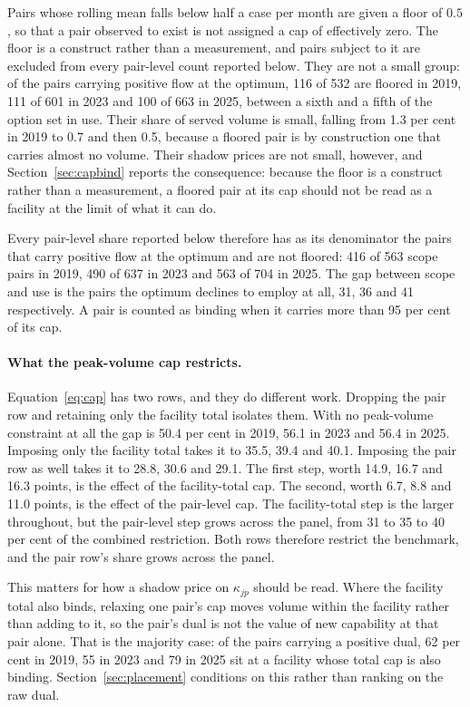 Pairs whose rolling mean falls below half a case per month are given a floor of
$0.5$, so that a pair observed to exist is not assigned a cap of effectively
zero. The floor is a construct rather than a measurement, and pairs subject to it
are excluded from every pair-level count reported below. They are not a small
group: of the pairs carrying positive flow at the optimum, 116 of 532 are floored
in 2019, 111 of 601 in 2023 and 100 of 663 in 2025, between a sixth and a fifth
of the option set in use. Their share of served volume is small, falling from
1.3 per cent in 2019 to 0.7 and then 0.5, because a floored pair is by
construction one that carries almost no volume. Their shadow prices are not
small, however, and Section~\ref{sec:capbind} reports the consequence: because
the floor is a construct rather than a measurement, a floored pair at its cap
should not be read as a facility at the limit of what it can do.

Every pair-level share reported below therefore has as its denominator the pairs
that carry positive flow at the optimum and are not floored: 416 of 563 scope
pairs in 2019, 490 of 637 in 2023 and 563 of 704 in 2025. The gap between scope
and use is the pairs the optimum declines to employ at all, 31, 36 and 41
respectively. A pair is counted as binding when it carries more than 95 per cent
of its cap.

\paragraph{What the peak-volume cap restricts.} Equation~\eqref{eq:cap} has two
rows, and they do different work. Dropping the pair row and retaining only the
facility total isolates them. With no peak-volume constraint at all the gap is
50.4 per cent in 2019, 56.1 in 2023 and 56.4 in 2025. Imposing only the facility
total takes it to 35.5, 39.4 and 40.1. Imposing the pair row as well takes it to
28.8, 30.6 and 29.1. The first step, worth 14.9, 16.7 and 16.3 points, is the effect of the facility-total cap. The
second, worth 6.7, 8.8 and 11.0 points, is the effect of the pair-level cap. The facility-total step is the larger throughout, but the pair-level step grows across the panel, from 31 to 35 to 40
per cent of the combined restriction. Both rows therefore restrict the benchmark, and the pair row's share grows across the panel.

This matters for how a shadow price on $\kappa_{jp}$ should be read. Where the
facility total also binds, relaxing one pair's cap moves volume within the
facility rather than adding to it, so the pair's dual is not the value of new
capability at that pair alone. That is the majority case: of the pairs carrying a
positive dual, 62 per cent in 2019, 55 in 2023 and 79 in 2025 sit at a facility
whose total cap is also binding. Section~\ref{sec:placement} conditions on this
rather than ranking on the raw dual.

